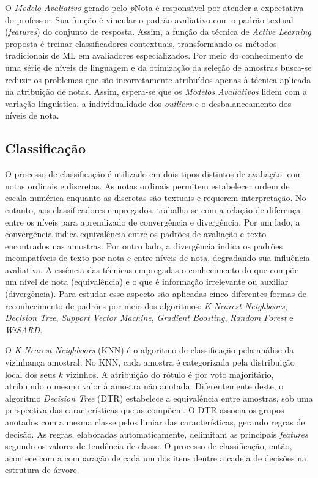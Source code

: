 O \textit{Modelo Avaliativo} gerado pelo \textit{p}Nota é responsável por atender a expectativa do professor. Sua função é vincular o padrão avaliativo com o padrão textual (\textit{features}) do conjunto de resposta. Assim, a função da técnica de \textit{Active Learning} proposta é treinar classificadores contextuais, transformando os métodos tradicionais de ML em avaliadores especializados. Por meio do conhecimento de uma série de níveis de linguagem e da otimização da seleção de amostras busca-se reduzir os problemas que são incorretamente atribuídos apenas à técnica aplicada na atribuição de notas. Assim, espera-se que os \textit{Modelos Avaliativos} lidem com a variação linguística, a individualidade dos \textit{outliers} e o desbalanceamento dos níveis de nota.


\subsection{Classificação}
\label{subsec-classificacao}

O processo de classificação é utilizado em dois tipos distintos de avaliação: com notas ordinais e discretas. As notas ordinais permitem estabelecer ordem de escala numérica enquanto as discretas são textuais e requerem interpretação. No entanto, aos classificadores empregados, trabalha-se com a relação de diferença entre os níveis para aprendizado de convergência e divergência. Por um lado, a convergência indica equivalência entre os padrões de avaliação e texto encontrados nas amostras. Por outro lado, a divergência indica os padrões incompatíveis de texto por nota e entre níveis de nota, degradando sua influência avaliativa. A essência das técnicas empregadas o conhecimento do que compõe um nível de nota (equivalência) e o que é informação irrelevante ou auxiliar (divergência). Para estudar esse aspecto são aplicadas cinco diferentes formas de reconhecimento de padrões por meio dos algoritmos: \textit{K-Nearest Neighboors}, \textit{Decision Tree}, \textit{Support Vector Machine}, \textit{Gradient Boosting}, \textit{Random Forest} e \textit{WiSARD}.

O \textit{K-Nearest Neighboors} (KNN) é o algoritmo de classificação pela análise da vizinhança amostral. No KNN, cada amostra é categorizada pela distribuição local dos seus $ k $ vizinhos. A atribuição do rótulo é por voto majoritário, atribuindo o mesmo valor à amostra não anotada. Diferentemente deste, o algoritmo \textit{Decision Tree} (DTR) estabelece a equivalência entre amostras, sob uma perspectiva das características que as compõem. O DTR associa os grupos anotados com a mesma classe pelos limiar das características, gerando regras de decisão. As regras, elaboradas automaticamente, delimitam as principais \textit{features} segundo os valores de tendência de classe. O processo de classificação, então, acontece com a comparação de cada um dos itens dentre a cadeia de decisões na estrutura de árvore.

